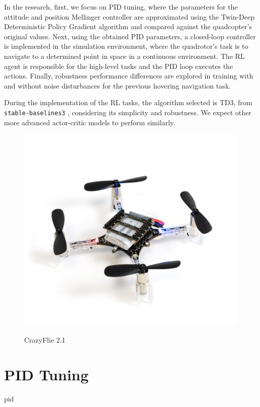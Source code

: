 \documentclass{LTHtwocol} %
\begin{document}
In the research, first, we focus on PID tuning, where the parameters for the attitude and position Mellinger controller \cite{mellinger} are approximated using the Twin-Deep Deterministic Policy Gradient\cite{td3} algorithm and compared against the quadcopter's original values. Next, using the obtained PID parameters, a closed-loop controller is implemented in the simulation environment, where the quadrotor's task is to navigate to a determined point in space in a continuous environment. The RL agent is responsible for the high-level tasks and the PID loop executes the actions. Finally, robustness performance differences are explored in training with and without noise disturbances for the previous hovering navigation task.

 During the implementation of the RL tasks, the algorithm selected is TD3, from \verb|stable-baselines3| \cite{stable_baselines3}, considering its simplicity and robustness. We expect other more advanced actor-critic models to perform similarly.

\begin{figure}[H]
	\centering
	\caption{CrazyFlie 2.1}
	\includegraphics[scale=0.5]{cf.png}
	\label{cf:fig}
\end{figure}

\section{PID Tuning}
{pid}
\end{document}
